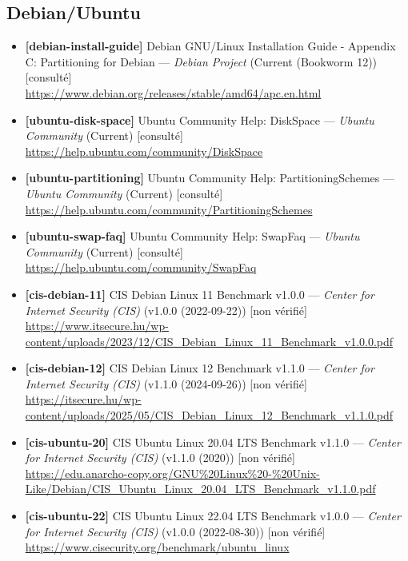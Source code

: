 \documentclass[10pt,a4paper]{article}
\begin{document}
\subsection{Debian/Ubuntu}
\begin{itemize}[leftmargin=1.6em]
\item \textbf{[debian-install-guide]} Debian GNU/Linux Installation Guide - Appendix C: Partitioning for Debian --- \textit{Debian Project} (Current (Bookworm 12)) \textcolor{cOk}{[consult\'e]}\\ \url{https://www.debian.org/releases/stable/amd64/apc.en.html}
\item \textbf{[ubuntu-disk-space]} Ubuntu Community Help: DiskSpace --- \textit{Ubuntu Community} (Current) \textcolor{cOk}{[consult\'e]}\\ \url{https://help.ubuntu.com/community/DiskSpace}
\item \textbf{[ubuntu-partitioning]} Ubuntu Community Help: PartitioningSchemes --- \textit{Ubuntu Community} (Current) \textcolor{cOk}{[consult\'e]}\\ \url{https://help.ubuntu.com/community/PartitioningSchemes}
\item \textbf{[ubuntu-swap-faq]} Ubuntu Community Help: SwapFaq --- \textit{Ubuntu Community} (Current) \textcolor{cOk}{[consult\'e]}\\ \url{https://help.ubuntu.com/community/SwapFaq}
\item \textbf{[cis-debian-11]} CIS Debian Linux 11 Benchmark v1.0.0 --- \textit{Center for Internet Security (CIS)} (v1.0.0 (2022-09-22)) \textcolor{cMed}{[non v\'erifi\'e]}\\ \url{https://www.itsecure.hu/wp-content/uploads/2023/12/CIS_Debian_Linux_11_Benchmark_v1.0.0.pdf}
\item \textbf{[cis-debian-12]} CIS Debian Linux 12 Benchmark v1.1.0 --- \textit{Center for Internet Security (CIS)} (v1.1.0 (2024-09-26)) \textcolor{cMed}{[non v\'erifi\'e]}\\ \url{https://itsecure.hu/wp-content/uploads/2025/05/CIS_Debian_Linux_12_Benchmark_v1.1.0.pdf}
\item \textbf{[cis-ubuntu-20]} CIS Ubuntu Linux 20.04 LTS Benchmark v1.1.0 --- \textit{Center for Internet Security (CIS)} (v1.1.0 (2020)) \textcolor{cMed}{[non v\'erifi\'e]}\\ \url{https://edu.anarcho-copy.org/GNU%20Linux%20-%20Unix-Like/Debian/CIS_Ubuntu_Linux_20.04_LTS_Benchmark_v1.1.0.pdf}
\item \textbf{[cis-ubuntu-22]} CIS Ubuntu Linux 22.04 LTS Benchmark v1.0.0 --- \textit{Center for Internet Security (CIS)} (v1.0.0 (2022-08-30)) \textcolor{cMed}{[non v\'erifi\'e]}\\ \url{https://www.cisecurity.org/benchmark/ubuntu_linux}

\end{itemize}
\end{document}
